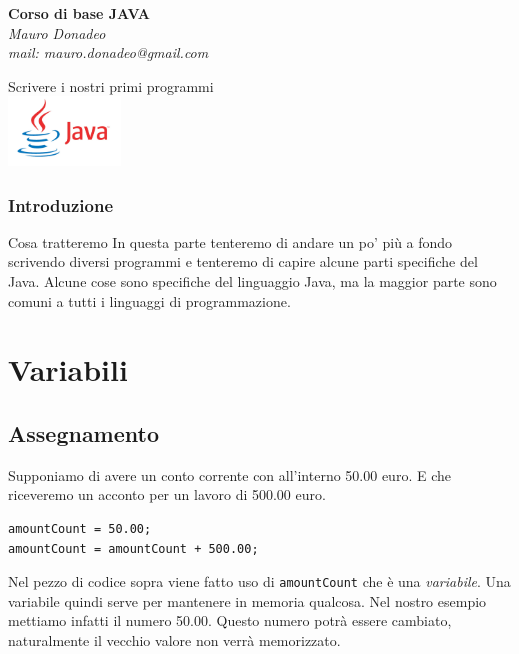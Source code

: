 \begin{frame}
	\begin{block}{}
		\begin{center}
			{\large\textbf{Corso di base JAVA}}\\
			\itshape{Mauro Donadeo}\\
			mail: mauro.donadeo@gmail.com
		\end{center}
	\end{block}
	\begin{block}{}	
		\begin{center}
			\large{Scrivere i nostri primi programmi}\\
			\includegraphics[width = 30mm]{images/java-logo.jpg}
		\end{center}
	\end{block}	
\end{frame}

\begin{frame}
\frametitle{Introduzione}
\begin{block}{Cosa tratteremo}
In questa parte tenteremo di andare un po' più a fondo scrivendo diversi programmi e tenteremo di capire
alcune parti specifiche del Java. Alcune cose sono specifiche del linguaggio Java, ma la maggior parte 
sono comuni a tutti i linguaggi di programmazione.
\end{block}
\end{frame}

\section*{Variabili}
\subsection*{Assegnamento}
\begin{frame}[fragile]
\begin{block}{}
Supponiamo di avere un conto corrente con all'interno 50.00 euro. E che riceveremo un acconto per un lavoro di 500.00 euro.
\end{block}
\pause
\begin{lstlisting}
amountCount = 50.00;
amountCount = amountCount + 500.00;
\end{lstlisting}
\begin{block}{}
Nel pezzo di codice sopra viene fatto uso di \texttt{amountCount} che è una \textit{variabile}. Una variabile quindi 
serve per mantenere in memoria qualcosa. Nel nostro esempio mettiamo infatti il numero 50.00. Questo numero potrà essere
cambiato, naturalmente il vecchio valore non verrà memorizzato.
\end{block}
\end{frame}

